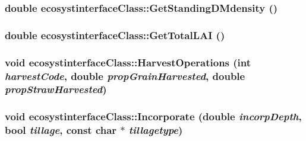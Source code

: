 \label{classecosystinterface_class_abc91c77ffd4557561789435c86849a21}
\hypertarget{classecosystinterface_class_a1f1dc9731b7216b361ac5ebe3303d42b}{
\subsubsection[{GetStandingDMdensity}]{\setlength{\rightskip}{0pt plus 5cm}double ecosystinterfaceClass::GetStandingDMdensity ()}}
\label{classecosystinterface_class_a1f1dc9731b7216b361ac5ebe3303d42b}
\hypertarget{classecosystinterface_class_ae52da265e52da2468db152b25ed389eb}{
\subsubsection[{GetTotalLAI}]{\setlength{\rightskip}{0pt plus 5cm}double ecosystinterfaceClass::GetTotalLAI ()}}
\label{classecosystinterface_class_ae52da265e52da2468db152b25ed389eb}
\hypertarget{classecosystinterface_class_adeea47518b841a57ed38f1210fe91311}{
\subsubsection[{HarvestOperations}]{\setlength{\rightskip}{0pt plus 5cm}void ecosystinterfaceClass::HarvestOperations (int {\em harvestCode}, \/  double {\em propGrainHarvested}, \/  double {\em propStrawHarvested})}}
\label{classecosystinterface_class_adeea47518b841a57ed38f1210fe91311}
\hypertarget{classecosystinterface_class_a6f6d16c5273187cdb9fd2da5dfc7237f}{
\subsubsection[{Incorporate}]{\setlength{\rightskip}{0pt plus 5cm}void ecosystinterfaceClass::Incorporate (double {\em incorpDepth}, \/  bool {\em tillage}, \/  const char $\ast$ {\em tillagetype})}}
